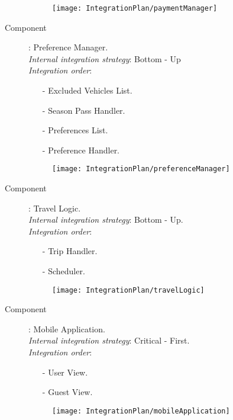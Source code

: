 \begin{description}
		\begin{figure}[H]
			\centering
			\texttt{[image: IntegrationPlan/paymentManager]}
		\end{figure}
	
	
	\vskip1.5cm
	\item[Component]: Preference Manager.\\
		\textit{Internal integration strategy}: Bottom - Up\\
		\textit{Integration order}:
		\begin{itemize}
			\item[-] Excluded Vehicles List.
			\item[-] Season Pass Handler.
			\item[-] Preferences List.
			\item[-] Preference Handler.
		\end{itemize}
		
		\begin{figure}[H]
			\centering
			\texttt{[image: IntegrationPlan/preferenceManager]}
		\end{figure}
		
		
	\vskip1.5cm
	\item[Component]: Travel Logic.\\
		\textit{Internal integration strategy}: Bottom - Up.\\
		\textit{Integration order}:
		\begin{itemize}	
			\item[-] Trip Handler.
			\item[-] Scheduler.
		\end{itemize}
		
		\begin{figure}[H]
			\centering
			\texttt{[image: IntegrationPlan/travelLogic]}
		\end{figure}
		
		
	
	\vskip1.5cm
	\item[Component]: Mobile Application.\\
		\textit{Internal integration strategy}: Critical - First.\\
		\textit{Integration order}:
		\begin{itemize}
			\item[-] User View.
			\item[-] Guest View.
		\end{itemize}
		
		\begin{figure}[H]
			\centering
			\texttt{[image: IntegrationPlan/mobileApplication]}
		\end{figure}
	

\end{description}
